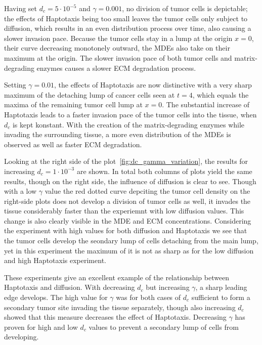 Having set $d_c=5\cdot 10^{-5}$ and $\gamma=0.001$, no division of tumor cells is depictable; the effects of Haptotaxis being too small leaves the tumor cells only subject to diffusion, which results in an even distribution process over time, also causing a slower invasion pace. Because the tumor cells stay in a lump at the origin $x=0$, their curve decreasing monotonely outward, the MDEs also take on their maximum at the origin. The slower invasion pace of both tumor cells and matrix-degrading enzymes causes a slower ECM degradation process. 

Setting $\gamma=0.01$, the effects of Haptotaxis are now distinctive with a very sharp maximum of the detaching lump of cancer cells seen at $t=4$, which equals the maxima of the remaining tumor cell lump at $x=0$. The substantial increase of Haptotaxis leads to a faster invasion pace of the tumor cells into the tissue, when $d_c$ is kept konstant. With the creation of the matrix-degrading enzymes while invading the surrounding tissue, a more even distribution of the MDEs is observed as well as faster ECM degradation. 

Looking at the right side of the plot~\ref{fig:dc_gamma_variation}, the results for increasing $d_c=1\cdot 10^{-3}$ are shown. In total both columns of plots yield the same results, though on the right side, the influence of diffusion is clear to see. Though with a low $\gamma$ value the red dotted curve depciting the tumor cell density on the right-side plots does not develop a division of tumor cells as well, it invades the tissue considerably faster than the experiemnt with low diffusion values. This change is also clearly visible in the MDE and ECM concentrations. Considering the experiment with high values for both diffusion and Haptotaxis we see that the tumor cells develop the seondary lump of cells detaching from the main lump, yet in this experiment the maximum of it is not as sharp as for the low diffusion and high Haptotaxis experiment.

These experiments give an excellent example of the relationship between Haptotaxis and diffusion. With decreasing $d_c$ but increasing $\gamma$, a sharp leading edge develops. The high value for $\gamma$ was for both cases of $d_c$ sufficient to form a secondary tumor site invading the tissue separately, though also increasing $d_c$ showed that this measure decreases the effect of Haptotaxis. Decreasing $\gamma$ has proven for high and low $d_c$ values to prevent a secondary lump of cells from developing. 

